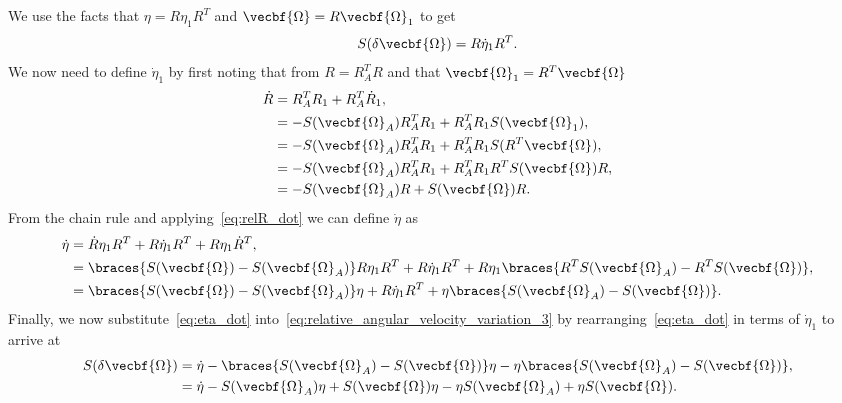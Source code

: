 \documentclass[11pt, reqno]{article}    %
\begin{document}
We use the facts that \( \eta = R \eta_1 R^T \) and \( \vecbf{\Omega} = R \vecbf{\Omega}_1\) to get
\begin{align}\label{eq:relative_angular_velocity_variation_3}
    S(\delta \vecbf{\Omega}) = R \dot{\eta}_1 R^T.
\end{align}
We now need to define \( \dot{\eta}_1\) by first noting that from \( R = R_A^T R\) and that \( \vecbf{\Omega}_1 = R^T \vecbf{\Omega}\)
\begin{align}\label{eq:relR_dot}
    \dot{R} &= R_A^T R_1 + R_A^T \dot{R}_1 , \nonumber\\
    &= - S(\vecbf{\Omega}_A) R_A^T R_1 + R_A^T R_1 S(\vecbf{\Omega}_1) ,\nonumber\\
    &= -S(\vecbf{\Omega}_A) R_A^T R_1 + R_A^T R_1 S(R^T \vecbf{\Omega}) , \nonumber\\
    &= -S(\vecbf{\Omega}_A)R_A^T R_1 + R_A^T R_1 R^T S(\vecbf{\Omega}) R ,\nonumber\\
    &= -S(\vecbf{\Omega}_A)R + S(\vecbf{\Omega}) R .
\end{align}
From the chain rule and applying~\cref{eq:relR_dot} we can define \( \dot{\eta} \) as
\begin{align}\label{eq:eta_dot}
    \dot{\eta} &= \dot{R} \eta_1 R^T + R \dot{\eta}_1 R^T + R \eta_1 \dot{R}^T , \nonumber\\
    &= \braces{S(\vecbf{\Omega}) - S(\vecbf{\Omega}_A)} R \eta_1 R^T + R \dot{\eta}_1 R^T + R \eta_1 \braces{R^T S(\vecbf{\Omega}_A) - R^T S(\vecbf{\Omega})} , \nonumber\\
    &= \braces{S(\vecbf{\Omega}) - S(\vecbf{\Omega}_A)} \eta + R \dot{\eta}_1 R^T + \eta \braces{S(\vecbf{\Omega}_A) - S(\vecbf{\Omega})} .
\end{align}
Finally, we now substitute~\cref{eq:eta_dot} into~\cref{eq:relative_angular_velocity_variation_3} by rearranging~\cref{eq:eta_dot} in terms of \( \dot{\eta}_1\) to arrive at
\begin{align}\label{eq:rel_ang_vel_var}
    S(\delta \vecbf{\Omega}) &= \dot{\eta} - \braces{S(\vecbf{\Omega}_A) - S(\vecbf{\Omega})} \eta - \eta \braces{S(\vecbf{\Omega}_A) - S(\vecbf{\Omega})} , \nonumber \\
    &= \dot{\eta} - S(\vecbf{\Omega}_A) \eta + S(\vecbf{\Omega}) \eta - \eta S(\vecbf{\Omega}_A) + \eta S(\vecbf{\Omega}) .
\end{align}
\end{document}
